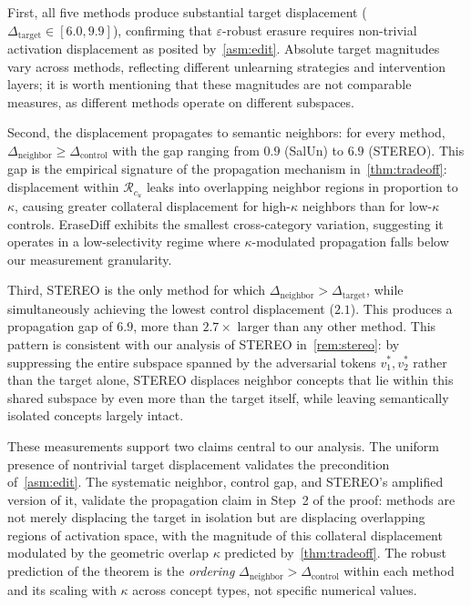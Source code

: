 First, all five methods produce substantial target displacement ($\Delta_{\mathrm{target}} \in [6.0, 9.9]$), confirming that $\varepsilon$-robust erasure requires non-trivial activation displacement as posited by~\cref{asm:edit}. Absolute target magnitudes vary across methods, reflecting different unlearning strategies and intervention layers; it is worth mentioning that these magnitudes are not comparable measures, as different methods operate on different subspaces.

Second, the displacement propagates to semantic neighbors: for every method, $\Delta_{\mathrm{neighbor}} \geq \Delta_{\mathrm{control}}$ with the gap ranging from $0.9$ (SalUn) to $6.9$ (STEREO). This gap is the empirical signature of the propagation mechanism in~\cref{thm:tradeoff}: displacement within $\mathcal{R}_{c_u}$ leaks into overlapping neighbor regions in proportion to $\kappa$, causing greater collateral displacement for high-$\kappa$ neighbors than for low-$\kappa$ controls. EraseDiff exhibits the smallest cross-category variation, suggesting it operates in a low-selectivity regime where $\kappa$-modulated propagation falls below our measurement granularity.

Third, STEREO is the only method for which $\Delta_{\mathrm{neighbor}} > \Delta_{\mathrm{target}}$, while simultaneously achieving the lowest control displacement ($2.1$). This produces a propagation gap of $6.9$, more than $2.7\times$ larger than any other method. This pattern is consistent with our analysis of STEREO in~\cref{rem:stereo}: by suppressing the entire subspace spanned by the adversarial tokens $v_1^*, v_2^*$ rather than the target alone, STEREO displaces neighbor concepts that lie within this shared subspace by even more than the target itself, while leaving semantically isolated concepts largely intact. 

These measurements support two claims central to our analysis. The uniform presence of nontrivial target displacement validates the precondition of~\cref{asm:edit}. The systematic neighbor, control gap, and STEREO's amplified version of it, validate the propagation claim in Step~2 of the proof: methods are not merely displacing the target in isolation but are displacing overlapping regions of activation space, with the magnitude of this collateral displacement modulated by the geometric overlap $\kappa$ predicted by~\cref{thm:tradeoff}. The robust prediction of the theorem is the \emph{ordering} $\Delta_{\mathrm{neighbor}} > \Delta_{\mathrm{control}}$ within each method and its scaling with $\kappa$ across concept types, not specific numerical values.


